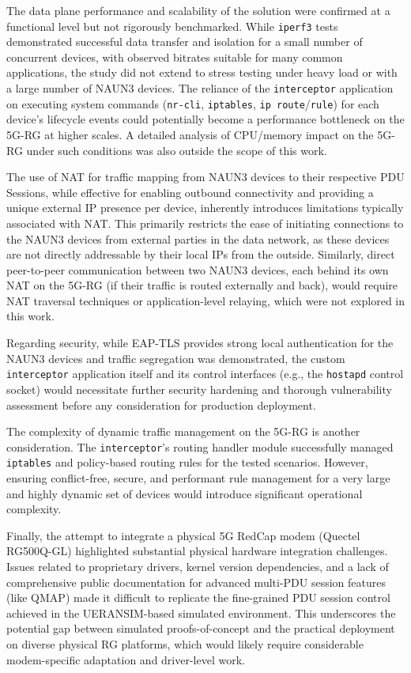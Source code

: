 The data plane performance and scalability of the solution were confirmed at a functional level but not rigorously benchmarked. While \texttt{iperf3} tests demonstrated successful data transfer and isolation for a small number of concurrent devices, with observed bitrates suitable for many common applications, the study did not extend to stress testing under heavy load or with a large number of \ac{NAUN3} devices. The reliance of the \texttt{interceptor} application on executing system commands (\texttt{nr-cli}, \texttt{iptables}, \texttt{ip route}/\texttt{rule}) for each device's lifecycle events could potentially become a performance bottleneck on the \ac{5G-RG} at higher scales. A detailed analysis of \ac{CPU}/memory impact on the \ac{5G-RG} under such conditions was also outside the scope of this work.

The use of \ac{NAT} for traffic mapping from \ac{NAUN3} devices to their respective \ac{PDU} Sessions, while effective for enabling outbound connectivity and providing a unique external \ac{IP} presence per device, inherently introduces limitations typically associated with \ac{NAT}. This primarily restricts the ease of initiating connections to the \ac{NAUN3} devices from external parties in the data network, as these devices are not directly addressable by their local \acp{IP} from the outside. Similarly, direct peer-to-peer communication between two \ac{NAUN3} devices, each behind its own \ac{NAT} on the \ac{5G-RG} (if their traffic is routed externally and back), would require \ac{NAT} traversal techniques or application-level relaying, which were not explored in this work.

Regarding security, while \ac{EAP-TLS} provides strong local authentication for the \ac{NAUN3} devices and traffic segregation was demonstrated, the custom \texttt{interceptor} application itself and its control interfaces (e.g., the \texttt{hostapd} control socket) would necessitate further security hardening and thorough vulnerability assessment before any consideration for production deployment.

The complexity of dynamic traffic management on the \ac{5G-RG} is another consideration. The \texttt{interceptor}'s routing handler module successfully managed \texttt{iptables} and policy-based routing rules for the tested scenarios. However, ensuring conflict-free, secure, and performant rule management for a very large and highly dynamic set of devices would introduce significant operational complexity.

Finally, the attempt to integrate a physical \ac{5G} RedCap modem (Quectel RG500Q-GL) highlighted substantial physical hardware integration challenges. Issues related to proprietary drivers, kernel version dependencies, and a lack of comprehensive public documentation for advanced multi-\ac{PDU} session features (like \ac{QMAP}) made it difficult to replicate the fine-grained \ac{PDU} session control achieved in the UERANSIM-based simulated environment. This underscores the potential gap between simulated proofs-of-concept and the practical deployment on diverse physical \ac{RG} platforms, which would likely require considerable modem-specific adaptation and driver-level work.

